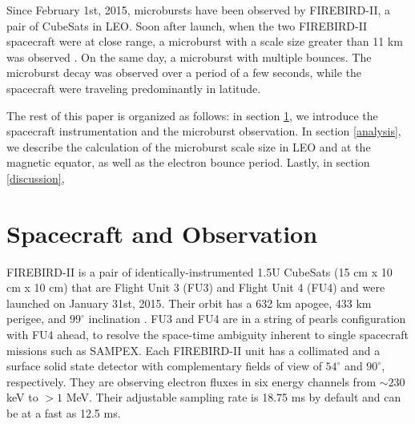 \documentclass[draft, linenumbers]{agujournal}
\begin{document}
Since February 1st, 2015, microbursts have been observed by FIREBIRD-II, a pair of CubeSats in LEO. Soon after launch, when the two FIREBIRD-II spacecraft were at close range, a microburst with a scale size greater than 11 km was observed \citep{Crew2016}. On the same day,  a microburst with multiple bounces.  The microburst decay was observed over a period of a few seconds, while the spacecraft were traveling predominantly in latitude. 

The rest of this paper is organized as follows: in section \ref{obs}, we introduce the spacecraft instrumentation and the microburst observation. In section \ref{analysis}, we describe the calculation of the microburst scale size in LEO and at the magnetic equator, as well as the electron bounce period. Lastly, in section \ref{discussion},  

\section{Spacecraft and Observation} \label{obs} %
FIREBIRD-II is a pair of identically-instrumented 1.5U CubeSats (15 cm x 10 cm x 10 cm) that are  Flight Unit 3 (FU3) and Flight Unit 4 (FU4) and were launched on January 31st, 2015. Their orbit has a 632 km apogee, 433 km perigee, and $99^{\circ}$ inclination \citep{Crew2016}. FU3 and FU4 are  in a string of pearls configuration with FU4 ahead, to resolve the space-time ambiguity inherent to single spacecraft missions such as SAMPEX. Each FIREBIRD-II unit has a collimated and a surface solid state detector with complementary fields of view of $54^{\circ}$ and $90^{\circ}$, respectively. They are observing electron fluxes in six energy channels from $\sim 230$ keV to $> 1$ MeV. Their adjustable sampling rate is 18.75 ms by default and can be at a fast as 12.5 ms. 
\end{document}
